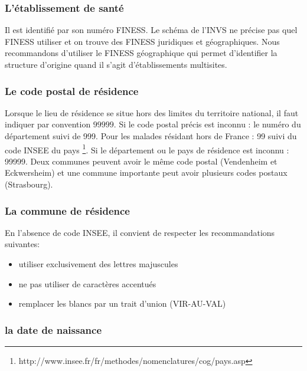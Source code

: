 \documentclass[12pt,english,french,twoside]{book}\usepackage[]{graphicx}\usepackage[]{color}
\begin{document}
\subsubsection{L'établissement de santé}

Il est identifié par son numéro FINESS. Le schéma de l'INVS ne précise pas quel FINESS utiliser et on trouve des FINESS juridiques et géographiques. Nous recommandons d'utiliser le FINESS géographique qui permet d'identifier la structure d'origine quand il s'agit d'établissements multisites.

\subsubsection{Le code postal de résidence}

Lorsque le lieu de résidence se situe hors des limites du territoire national, il faut indiquer par convention $99999$.
Si le code postal précis est inconnu : le numéro du département suivi de 999.
Pour les malades résidant hors de France : 99 suivi du code INSEE du pays \footnote{http://www.insee.fr/fr/methodes/nomenclatures/cog/pays.asp}.
Si le département ou le pays de résidence est inconnu : 99999.
Deux communes peuvent avoir le même code postal (Vendenheim et Eckwersheim) et une commune importante peut avoir plusieurs codes postaux (Strasbourg).

\subsubsection{La commune de résidence}

En l'absence de code INSEE, il convient de respecter les recommandations suivantes:
\begin{itemize}
  \item utiliser exclusivement des lettres majuscules
  \item ne pas utiliser de caractères accentués
  \item remplacer les blancs par un trait d'union (VIR-AU-VAL)
\end{itemize}

\subsubsection{la date de naissance}
\end{document}
